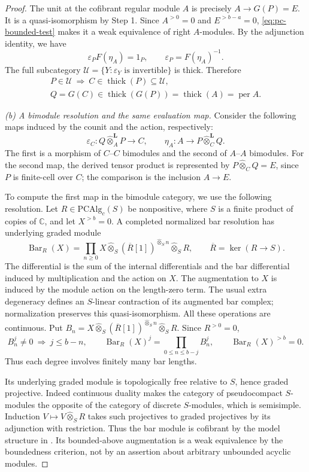 \documentclass[12pt,a4paper,english,reqno]{amsart}
\theoremstyle{plain}
\theoremstyle{definition}
\numberwithin{equation}{section}
\def\ep{\varepsilon}
\def\et{\eta}
\def\thick{\operatorname{thick}}
\def\perf{\operatorname{per}}
\def\bbC{{\mathbb C}}
\def\ox{\otimes}
\begin{document}
\begin{proof}
The unit at the cofibrant regular module $A$ is precisely $A\to G(P)=E$. It is a quasi-isomorphism by Step 1. Since $A^{>0}=0$ and $E^{>b-a}=0$,
\eqref{eq:pc-bounded-test} makes it a weak equivalence of right
$A$-modules. By the adjunction identity, we have
\[
 \ep_P F(\et_A)=1_P,
 \qquad \ep_P=F(\et_A)^{-1}.
\]
The full subcategory $\mathcal U=\{Y:\ep_Y\text{ is invertible}\}$ is thick. Therefore
\[
 \begin{gathered}
 P\in\mathcal U\ \Longrightarrow\ C\in\thick(P)\subseteq\mathcal U,\\
 Q=G(C)\in\thick(G(P))=\thick(A)=\perf A.
 \end{gathered}
\]

\medskip\noindent\emph{(b) A bimodule resolution and the same evaluation map.}
Consider the following maps induced by the counit and the action, respectively:
\[
 \ep_C:Q\widehat\ox_A^{\mathbf L}P\longrightarrow C,
 \qquad
 \et_A:A\longrightarrow P\widehat\ox_C^{\mathbf L}Q.
\]
The first is a morphism of $C$--$C$ bimodules and the second of $A$--$A$ bimodules. For the second map, the derived tensor product is represented by $P\widehat\ox_C Q=E$, since $P$ is finite-cell over $C$; the comparison is the inclusion $A\to E$.

To compute the first map in the bimodule category, we use the following resolution. Let $R\in\mathrm{PCAlg}_c(S)$ be nonpositive, where $S$ is a finite product of copies of $\bbC$, and let $X^{>b}=0$. A completed normalized bar resolution has underlying graded module
\[
 \operatorname{Bar}_R(X)
 =\prod_{n\geq0}
 X\widehat\ox_S (\overline R[1])^{\widehat\ox_S n}
       \widehat\ox_S R,
 \qquad \overline R=\ker(R\to S).
\]
The differential is the sum of the internal differentials and the bar differential induced by multiplication and the action on $X$. The augmentation to $X$ is induced by the module action on the length-zero term. The usual extra degeneracy defines an $S$-linear contraction of its augmented bar complex; normalization preserves this quasi-isomorphism. All these operations are continuous. Put $B_n=X\widehat\ox_S(\overline R[1])^{\widehat\ox_S n}\widehat\ox_S R$. Since $R^{>0}=0$,
\[
 B_n^j\ne0\ \Longrightarrow\ j\leq b-n,
 \qquad
 \operatorname{Bar}_R(X)^j=\prod_{0\leq n\leq b-j}B_n^j,
 \qquad \operatorname{Bar}_R(X)^{>b}=0.
\]
Thus each degree involves finitely many bar lengths.

Its underlying graded module is topologically free relative to $S$, hence graded projective. Indeed continuous duality makes the category of pseudocompact $S$-modules the opposite of the category of discrete $S$-modules, which is semisimple. Induction $V\mapsto V\widehat\ox_S R$ takes such projectives to graded projectives by its adjunction with restriction. Thus the bar module is cofibrant by the model structure in \cite[Section 6]{VdB}. Its bounded-above augmentation is a weak equivalence by the boundedness criterion, not by an assertion about arbitrary unbounded acyclic modules.


\end{proof}
\end{document}
